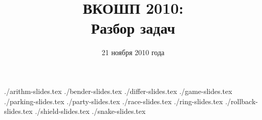 \documentclass[12pt]{beamer}
\title{ВКОШП 2010:\\ Разбор задач}
\date{21 ноября 2010 года}
\begin{document}
\maketitle

{./arithm-slides.tex}
{./bender-slides.tex}
{./differ-slides.tex}
{./game-slides.tex}
{./parking-slides.tex}
{./party-slides.tex}
{./race-slides.tex}
{./ring-slides.tex}
{./rollback-slides.tex}
{./shield-slides.tex}
{./snake-slides.tex}
\end{document}
